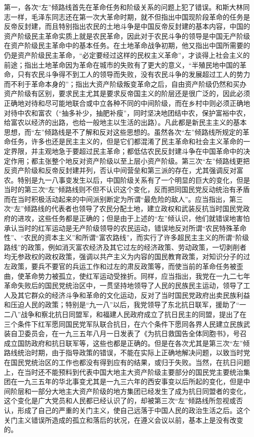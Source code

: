 第一，各次“左”倾路线首先在革命任务和阶级关系的问题上犯了错误。和斯大林同志一样，毛泽东同志还在第一次大革命时期，就不但指出中国现阶段革命的任务是反帝反封建，而且特别指出农民的土地斗争是中国反帝反封建的基本内容，中国的资产阶级民主革命实质上就是农民革命，因此对于农民斗争的领导是中国无产阶级在资产阶级民主革命中的基本任务。在土地革命战争初期，他又指出中国所需要的仍是资产阶级民主革命，“必定要经过这样的民权主义革命”，才谈得上社会主义的前途；指出土地革命因为革命在城市的失败有了更大的意义，“半殖民地中国的革命，只有农民斗争得不到工人的领导而失败，没有农民斗争的发展超过工人的势力而不利于革命本身的”；指出大资产阶级叛变革命之后，自由资产阶级仍然和买办资产阶级有区别，要求民主尤其是要求反帝国主义的阶层还是很广泛的，因此必须正确地对待和尽可能地联合或中立各种不同的中间阶级，而在乡村中则必须正确地对待中农和富农（“抽多补少，抽肥补瘦”，同时坚决地团结中农，保护富裕中农，给富农以经济的出路，也给一般地主以生活的出路）。凡此都是新民主主义的基本思想，而“左”倾路线是不了解和反对这些思想的。虽然各次“左”倾路线所规定的革命任务，许多也还是民主主义的，但是它们都混淆了民主革命和社会主义革命的一定界限，并主观地急于要超过民主革命；都低估农民反封建斗争在中国革命中的决定作用；都主张整个地反对资产阶级以至上层小资产阶级。第三次“左”倾路线更把反资产阶级和反帝反封建并列，否认中间营垒和第三派的存在，尤其强调反对富农。特别是九一八事变发生以后，中国阶级关系有了一个明显的巨大的变化，但是当时的第三次“左”倾路线则不但不认识这个变化，反而把同国民党反动统治有矛盾而在当时积极活动起来的中间派别断定为所谓“最危险的敌人”。应当指出，第三次“左”倾路线的代表者也领导了农民分配土地，建立政权和武装反抗当时国民党政府的进攻，这些任务都是正确的；但是由于上述的“左”倾认识，他们就错误地害怕承认当时的红军运动是无产阶级领导的农民运动，错误地反对所谓“农民特殊革命性”、“农民的资本主义”和所谓“富农路线”，而实行了许多超民主主义的所谓“阶级路线”的政策，例如消灭富农经济及其它过左的经济政策、劳动政策，一切剥削者均无参政权的政权政策，强调以共产主义为内容的国民教育政策，对知识分子的过左政策，要兵不要官的兵运工作和过左的肃反政策等，而使当前的革命任务被歪曲，使革命势力被孤立，使红军运动受挫折。同样，应当指出，我党在一九二七年革命失败后的国民党统治区中，一贯坚持地领导了人民的民族民主运动，领导了工人及其它群众的经济斗争和革命的文化运动，反对了当时国民党政府出卖民族利益和压迫人民的政策；特别是“九一八”以后，我党领导了东北抗日联军，援助了“一二八”战争和察北抗日同盟军，和福建人民政府成立了抗日民主的同盟，提出了在三个条件下红军愿同国民党军队联合抗日，在六个条件下愿同各界人民建立民族武装自卫委员会，在一九三五年八月一日发表了《为抗日救国告全体同胞书》，号召成立国防政府和抗日联军等，这些也都是正确的。但是在各次尤其是第三次“左”倾路线统治时期，由于指导政策的错误，不能在实际上正确地解决问题，以致当时党在国民党统治区的工作也都没有得到应有的结果，或归于失败。当然，在抗日问题上，在当时还不能预料到代表中国大地主大资产阶级主要部分的国民党主要统治集团在一九三五年的华北事变尤其是一九三六年的西安事变以后所起的变化，但是中间阶层和一部分大地主大资产阶级的地方集团已经发生了成为抗日同盟者的变化，这个变化是广大党员和人民都已经认识了的，却被第三次“左”倾路线所忽视或否认，形成了自己的严重的关门主义，使自己远落于中国人民的政治生活之后。这个关门主义错误所造成的孤立和落后的状况，在遵义会议以前，基本上是没有改变的。

